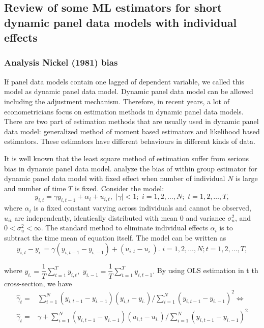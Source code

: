 \documentclass[12pt,a4paper,hyperref]{article}
\begin{document}
\subsection{Review of some ML estimators for short dynamic panel data models with individual effects}
\subsubsection{Analysis Nickel (1981) bias}
If panel data models contain one lagged of dependent variable, we called this model as dynamic panel data model. Dynamic panel data model can be allowed including the adjustment mechanism. Therefore, in recent years, a lot of econometricians focus on estimation methods in dynamic panel data models. There are two part of estimation methods that are usually used in dynamic panel data model: generalized method of moment based estimators and likelihood based estimators. These estimators have different behaviours in different kinds of data.

It is well known that the least square method of estimation suffer from serious bias in dynamic panel data model. \citet{Nickell:1981} analyze the bias of within group estimator for dynamic panel data model with fixed effect when number of individual $N$ is large and number of time $T$  is fixed.
Consider the model:
\begin{equation}
y_{i,t}=\gamma y_{i,t-1}+\alpha_{i}+u_{i,t}, \,\, \left\vert\gamma \right\vert<1;\,\,  i=1,2,\ldots,N;\,\, t=1,2,\ldots,T, \label{1}
\end{equation}
where $\alpha_{i}$ is a fixed constant varying across individuals and cannot be observed, $u_{it}$ are independently, identically distributed with mean 0 and variance $\sigma^{2}_{u}$, and $0<\sigma^{2}_{u}<\infty$. The standard method to eliminate individual effects $\alpha_{i}$ is to subtract the time mean of equation itself.
The model can be written as
\begin{equation}
y_{i,t}-y_{i.}=\gamma (y_{i,t-1}-y_{i.-1})+(u_{i,t}-u_{i.}).  \, \,  i=1,2,\ldots,N; t=1,2,\ldots,T, 
\end{equation}

where $y_{i.}=\dfrac{1}{T} \sum^{T}_{t=1} y_{i,t}, \,\, y_{i.-1}=\dfrac{1}{T} \sum^{T}_{t=1} y_{i,t-1}.$
By using OLS estimation in t th cross-section, we have
\begin{equation}
\begin{split}
\hat{\gamma}_{t}=&\sum^{N}_{i=1}(y_{i,t-1}-y_{i.-1})(y_{i,t}-y_{i.})/\sum^{N}_{i=1}(y_{i,t-1}-y_{i.-1})^{2}
\Leftrightarrow  \\
 \hat{\gamma}_{t}=& \gamma+ \sum^{N}_{i=1}(y_{i,t-1}-y_{i.-1})(u_{i,t}-u_{i.})/\sum^{N}_{i=1}(y_{i,t-1}-y_{i.-1})^{2}
\end{split}
\end{equation}
\end{document}
